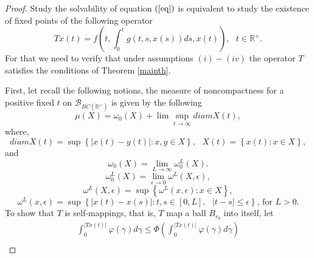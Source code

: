 \documentclass{amsart}
\theoremstyle{plain}
\numberwithin{equation}{section}
\begin{document}
\begin{proof}
Study the solvability of equation $\left( \text{\ref{eq}}\right) $ is
equivalent to study the existence of fixed points of the following operator\begin{equation*}
Tx\left( t\right) =f\left( t,\int_{0}^{t}g\left( t,s,x\left( s\right)
\right) ds,x\left( t\right) \right) ,\text{ }t\in \mathbb{R}^{+}.
\end{equation*}For that we need to verify that under assumptions $\left( i\right) -\left(
iv\right) $ the operator $T$ satisfies the conditions of Theorem \ref{mainth}.

First, let recall the following notions, the measure of noncompactness for a
positive fixed $t$ on $\mathcal{B}_{BC\left( \mathbb{R}^{+}\right) }$ is
given by the following\begin{equation*}
\mu \left( X\right) =\omega _{0}\left( X\right) +\lim \sup_{t\rightarrow
\infty }diamX\left( t\right) ,
\end{equation*}where,\begin{equation*}
diamX\left( t\right) =\sup \left\{ \left\vert x\left( t\right) -y\left(
t\right) \right\vert :x,y\in X\right\} ,\text{ }X\left( t\right) =\left\{
x\left( t\right) :x\in X\right\} ,
\end{equation*}and\begin{equation*}
\omega _{0}\left( X\right) =\lim_{L\rightarrow \infty }\omega _{0}^{L}\left(
X\right) .
\end{equation*}\begin{equation*}
\omega _{0}^{L}\left( X\right) =\lim_{\epsilon \rightarrow 0}\omega
^{L}\left( X,\epsilon \right) ,
\end{equation*}\begin{equation*}
\omega ^{L}\left( X,\epsilon \right) =\sup \left\{ \omega ^{L}\left(
x,\epsilon \right) :x\in X\right\} ,
\end{equation*}\begin{equation*}
\omega ^{L}\left( x,\epsilon \right) =\sup \left\{ \left\vert x\left(
t\right) -x\left( s\right) \right\vert :t,s\in \left[ 0,L\right] ,\text{ }\left\vert t-s\right\vert \leqslant \epsilon \right\} \text{, for }L>0.
\end{equation*}To show that $T$ is self-mappings, that is, $T$ map a ball $B_{r_{0}}$ into
itself, let\begin{multline*}
\int_{0}^{\left\vert Tx\left( t\right) \right\vert }\varphi \left( \gamma
\right) d\gamma \leqslant \Phi \left( \int_{0}^{\left\vert Tx\left( t\right)
\right\vert }\varphi \left( \gamma \right) d\gamma \right) \\

\end{multline*}
\end{proof}
\end{document}
